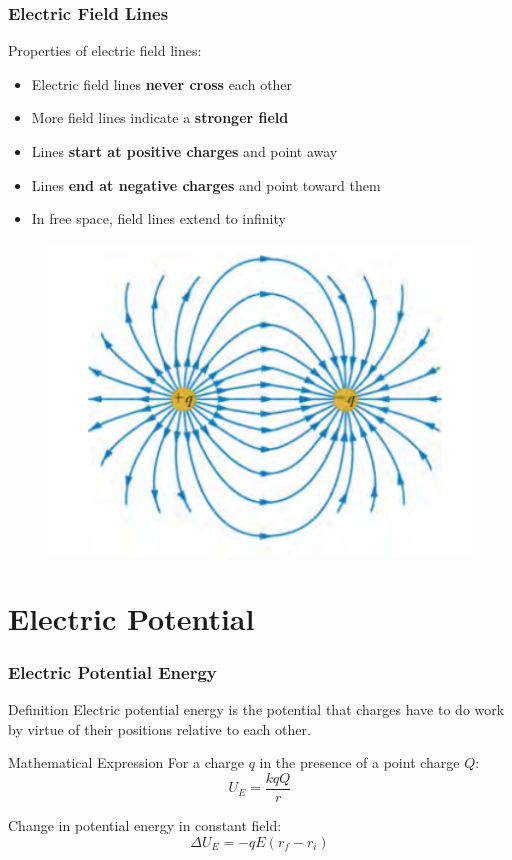 \documentclass{beamer}
\begin{document}
\begin{frame}
    \frametitle{Electric Field Lines}
    Properties of electric field lines:
    \begin{itemize}
        \item Electric field lines \textbf{never cross} each other
        \item More field lines indicate a \textbf{stronger field}
        \item Lines \textbf{start at positive charges} and point away
        \item Lines \textbf{end at negative charges} and point toward them
        \item In free space, field lines extend to infinity
    \end{itemize}
    
    
        \begin{figure}
            \centering
            \includegraphics[width=0.5\linewidth]{phys11-electrostatics-field-lines-positive-negative-charges.png}
        \end{figure}
    
\end{frame}

\section{Electric Potential}

\begin{frame}
    \frametitle{Electric Potential Energy}
    \begin{block}{Definition}
        Electric potential energy is the potential that charges have to do work by virtue of their positions relative to each other.
    \end{block}
    
    \begin{block}{Mathematical Expression}
        For a charge $q$ in the presence of a point charge $Q$:
        \begin{equation}
            U_E = \frac{kqQ}{r}
        \end{equation}
        
        Change in potential energy in constant field:
        \begin{equation}
            \Delta U_E = -qE(r_f - r_i)
        \end{equation}
    \end{block}
\end{frame}
\end{document}
